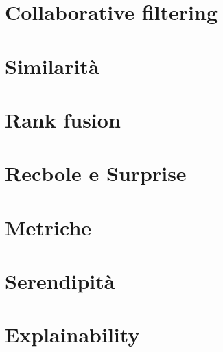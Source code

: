 \section{Collaborative filtering}

\section{Similarità}

\section{Rank fusion}

\section{Recbole e Surprise}

\section{Metriche}

\section{Serendipità}

\section{Explainability}
